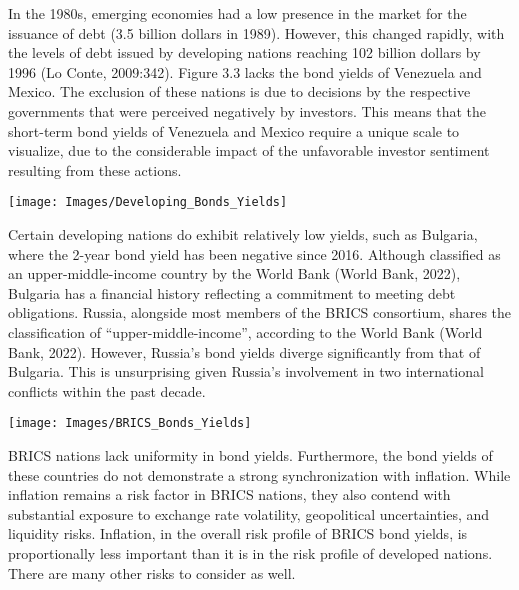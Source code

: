 \documentclass[11pt,preprint, authoryear]{elsarticle}
\let\origfigure\figure
\let\endorigfigure\endfigure
\renewenvironment{figure}[1][2] {
    \expandafter\origfigure\expandafter[H]
} {
    \endorigfigure
}
\numberwithin{equation}{section}
\numberwithin{figure}{section}
\numberwithin{table}{section}
\begin{document}
In the 1980s, emerging economies had a low presence in the market for
the issuance of debt (3.5 billion dollars in 1989). However, this
changed rapidly, with the levels of debt issued by developing nations
reaching 102 billion dollars by 1996 (Lo Conte, 2009:342). Figure 3.3
lacks the bond yields of Venezuela and Mexico. The exclusion of these
nations is due to decisions by the respective governments that were
perceived negatively by investors. This means that the short-term bond
yields of Venezuela and Mexico require a unique scale to visualize, due
to the considerable impact of the unfavorable investor sentiment
resulting from these actions.

\begin{figure}

{\centering \texttt{[image: Images/Developing\_Bonds\_Yields]} 

}

\caption{Bond Yields of Developing Nations \label{Figure3.3}}\label{fig:unnamed-chunk-4}
\end{figure}

Certain developing nations do exhibit relatively low yields, such as
Bulgaria, where the 2-year bond yield has been negative since 2016.
Although classified as an upper-middle-income country by the World Bank
(World Bank, 2022), Bulgaria has a financial history reflecting a
commitment to meeting debt obligations. Russia, alongside most members
of the BRICS consortium, shares the classification of
``upper-middle-income'', according to the World Bank (World Bank, 2022).
However, Russia's bond yields diverge significantly from that of
Bulgaria. This is unsurprising given Russia's involvement in two
international conflicts within the past decade.

\begin{figure}

{\centering \texttt{[image: Images/BRICS\_Bonds\_Yields]} 

}

\caption{Bond Yields of BRICS Nations \label{Figure3.4}}\label{fig:unnamed-chunk-5}
\end{figure}

BRICS nations lack uniformity in bond yields. Furthermore, the bond
yields of these countries do not demonstrate a strong synchronization
with inflation. While inflation remains a risk factor in BRICS nations,
they also contend with substantial exposure to exchange rate volatility,
geopolitical uncertainties, and liquidity risks. Inflation, in the
overall risk profile of BRICS bond yields, is proportionally less
important than it is in the risk profile of developed nations. There are
many other risks to consider as well.
\end{document}

